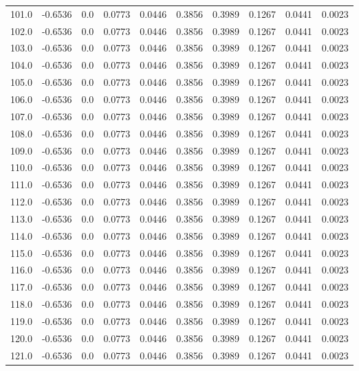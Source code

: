 \begin{longtable}{lrrrrrrrrr}
101.0 & -0.6536 & 0.0 & 0.0773 & 0.0446 & 0.3856 & 0.3989 & 0.1267 & 0.0441 & 0.0023 \\
102.0 & -0.6536 & 0.0 & 0.0773 & 0.0446 & 0.3856 & 0.3989 & 0.1267 & 0.0441 & 0.0023 \\
103.0 & -0.6536 & 0.0 & 0.0773 & 0.0446 & 0.3856 & 0.3989 & 0.1267 & 0.0441 & 0.0023 \\
104.0 & -0.6536 & 0.0 & 0.0773 & 0.0446 & 0.3856 & 0.3989 & 0.1267 & 0.0441 & 0.0023 \\
105.0 & -0.6536 & 0.0 & 0.0773 & 0.0446 & 0.3856 & 0.3989 & 0.1267 & 0.0441 & 0.0023 \\
106.0 & -0.6536 & 0.0 & 0.0773 & 0.0446 & 0.3856 & 0.3989 & 0.1267 & 0.0441 & 0.0023 \\
107.0 & -0.6536 & 0.0 & 0.0773 & 0.0446 & 0.3856 & 0.3989 & 0.1267 & 0.0441 & 0.0023 \\
108.0 & -0.6536 & 0.0 & 0.0773 & 0.0446 & 0.3856 & 0.3989 & 0.1267 & 0.0441 & 0.0023 \\
109.0 & -0.6536 & 0.0 & 0.0773 & 0.0446 & 0.3856 & 0.3989 & 0.1267 & 0.0441 & 0.0023 \\
110.0 & -0.6536 & 0.0 & 0.0773 & 0.0446 & 0.3856 & 0.3989 & 0.1267 & 0.0441 & 0.0023 \\
111.0 & -0.6536 & 0.0 & 0.0773 & 0.0446 & 0.3856 & 0.3989 & 0.1267 & 0.0441 & 0.0023 \\
112.0 & -0.6536 & 0.0 & 0.0773 & 0.0446 & 0.3856 & 0.3989 & 0.1267 & 0.0441 & 0.0023 \\
113.0 & -0.6536 & 0.0 & 0.0773 & 0.0446 & 0.3856 & 0.3989 & 0.1267 & 0.0441 & 0.0023 \\
114.0 & -0.6536 & 0.0 & 0.0773 & 0.0446 & 0.3856 & 0.3989 & 0.1267 & 0.0441 & 0.0023 \\
115.0 & -0.6536 & 0.0 & 0.0773 & 0.0446 & 0.3856 & 0.3989 & 0.1267 & 0.0441 & 0.0023 \\
116.0 & -0.6536 & 0.0 & 0.0773 & 0.0446 & 0.3856 & 0.3989 & 0.1267 & 0.0441 & 0.0023 \\
117.0 & -0.6536 & 0.0 & 0.0773 & 0.0446 & 0.3856 & 0.3989 & 0.1267 & 0.0441 & 0.0023 \\
118.0 & -0.6536 & 0.0 & 0.0773 & 0.0446 & 0.3856 & 0.3989 & 0.1267 & 0.0441 & 0.0023 \\
119.0 & -0.6536 & 0.0 & 0.0773 & 0.0446 & 0.3856 & 0.3989 & 0.1267 & 0.0441 & 0.0023 \\
120.0 & -0.6536 & 0.0 & 0.0773 & 0.0446 & 0.3856 & 0.3989 & 0.1267 & 0.0441 & 0.0023 \\
121.0 & -0.6536 & 0.0 & 0.0773 & 0.0446 & 0.3856 & 0.3989 & 0.1267 & 0.0441 & 0.0023 \\

\end{longtable}

